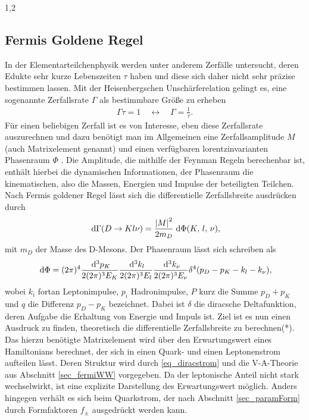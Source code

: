 \documentclass[11pt,a4paper,twoside,draft]{report}
\begin{document}
\begin{spacing}{1,2}
\subsection{Fermis Goldene Regel}
\label{sec_fermigoldenrule}
In der Elementarteilchenphysik werden unter anderem Zerfälle untersucht, deren Edukte sehr kurze Lebenszeiten $\tau$ haben und diese sich daher nicht sehr präzise
bestimmen lassen. Mit der Heisenbergschen Unschärferelation gelingt es, eine sogenannte Zerfallsrate $\Gamma$ als bestimmbare Größe zu erheben
\begin{align}
 \Gamma \tau = 1 \quad \leftrightarrow\quad  \Gamma = \frac{1}{\tau}.
\end{align} 
Für einen beliebigen Zerfall ist es von Interesse, eben diese Zerfallsrate auszurechnen und dazu
benötigt man im Allgemeinen eine Zerfallsamplitude $M$ (auch Matrixelement genannt) und einen verfügbaren lorentzinvarianten Phasenraum $\Phi$ 
\cite{TeilFortgeschr}\cite{Griffiths}. Die Amplitude,
die mithilfe der Feynman Regeln berechenbar ist, enthält hierbei die dynamischen Informationen, der Phasenraum die kinematischen, also die Massen, Energien
und Impulse der beteiligten Teilchen. Nach Fermis goldener Regel lässt sich die differentielle Zerfallsbreite ausdrücken durch
\begin{align}
 \; \mathrm{d} \Gamma(D \rightarrow K l \nu) = \frac{\left|M\right|^2}{2m_D}\; \mathrm{d} \Phi(K, \,l,\, \nu),
 \label{eq_fermirule}
\end{align}
mit $m_D$ der Masse des D-Mesons. Der Phasenraum lässt sich schreiben als
\begin{align}
 \; \mathrm{d} \Phi = (2\pi)^4 \frac{\; \mathrm{d}^3p_K}{2(2\pi)^3E_K}\frac{\; \mathrm{d}^3k_l}{2(2\pi)^3E_l}\frac{\; \mathrm{d}^3k_\nu}{2(2\pi)^3E_\nu}\delta^4(p_D-p_K-k_l-k_\nu),
\end{align}
wobei $k_i$ fortan Leptonimpulse, $p_i$ Hadronimpulse, $P$ kurz die Summe $p_D+p_K$ und $q$ die Differenz $p_D - p_K$ bezeichnet. 
Dabei ist $\delta$ die diracsche Deltafunktion, deren Aufgabe die Erhaltung von Energie und Impuls ist. Ziel ist es nun einen Ausdruck zu finden,
theoretisch die differentielle Zerfallsbreite zu berechnen(*). Das hierzu benötigte Matrixelement wird über den Erwartungswert eines Hamiltonians berechnet,
der sich in einen Quark- und einen Leptonenstrom aufteilen lässt. Deren Struktur wird durch \eqref{eq_diracstrom} und die V-A-Theorie aus Abschnitt 
\ref{sec_fermiWW} vorgegeben. Da der leptonische Anteil nicht stark wechselwirkt, ist eine explizite Darstellung des Erwartungswert möglich. Anders hingegen
verhält es sich beim Quarkstrom, der nach Abschnitt \ref{sec_paramForm} durch Formfaktoren $f_\pm$ ausgedrückt werden kann.

\end{spacing}
\end{document}
